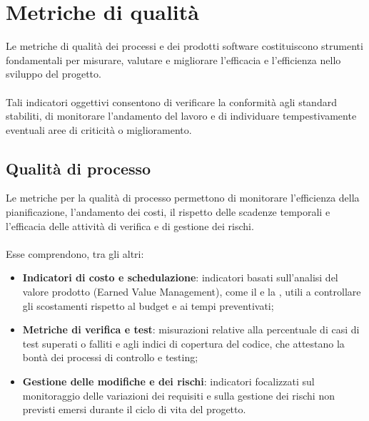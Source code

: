 \section{Metriche di qualità}

Le metriche di qualità dei processi e dei prodotti software costituiscono strumenti fondamentali per misurare, valutare e migliorare l'efficacia e l'efficienza nello sviluppo del progetto. \\
\\
Tali indicatori oggettivi consentono di verificare la conformità agli standard stabiliti, di monitorare l'andamento del lavoro e di individuare tempestivamente eventuali aree di criticità o miglioramento.

\subsection{Qualità di processo}
Le metriche per la qualità di processo permettono di monitorare l'efficienza della pianificazione, l'andamento dei costi, il rispetto delle scadenze temporali e l'efficacia delle attività di verifica e di gestione dei rischi.\\
\\
Esse comprendono, tra gli altri:
\begin{itemize}
    \item \textbf{Indicatori di costo e schedulazione}: indicatori basati sull'analisi del valore prodotto (Earned Value Management), come il \emph{} e la \emph{}, utili a controllare gli scostamenti rispetto al budget e ai tempi preventivati;
    \item \textbf{Metriche di verifica e test}: misurazioni relative alla percentuale di casi di test superati o falliti e agli indici di copertura del codice, che attestano la bontà dei processi di controllo e testing;
    \item \textbf{Gestione delle modifiche e dei rischi}: indicatori focalizzati sul monitoraggio delle variazioni dei requisiti e sulla gestione dei rischi non previsti emersi durante il ciclo di vita del progetto.
\end{itemize}

